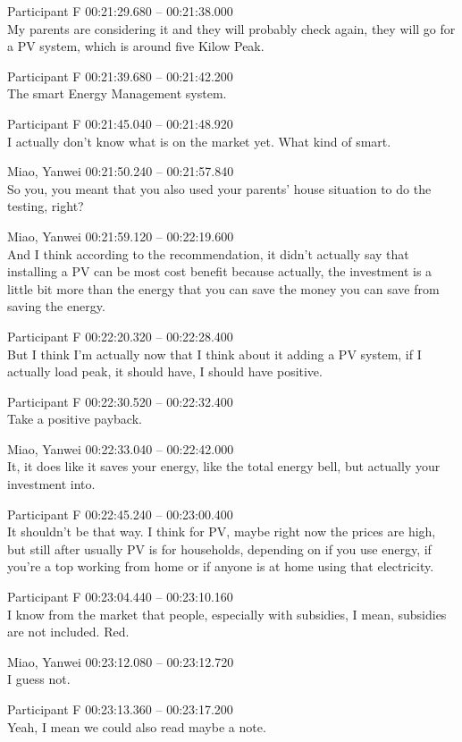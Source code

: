 {Participant F 00:21:29.680 -- 00:21:38.000 \\
My parents are considering it and they will probably check again, they will go for a PV system, which is around five Kilow Peak.

Participant F 00:21:39.680 -- 00:21:42.200 \\
The smart Energy Management system.

Participant F 00:21:45.040 -- 00:21:48.920 \\
I actually don't know what is on the market yet. What kind of smart.

Miao, Yanwei 00:21:50.240 -- 00:21:57.840 \\
So you, you meant that you also used your parents' house situation to do the testing, right?

Miao, Yanwei 00:21:59.120 -- 00:22:19.600 \\
And I think according to the recommendation, it didn't actually say that installing a PV can be most cost benefit because actually, the investment is a little bit more than the energy that you can save the money you can save from saving the energy.

Participant F 00:22:20.320 -- 00:22:28.400 \\
But I think I'm actually now that I think about it adding a PV system, if I actually load peak, it should have, I should have positive.

Participant F 00:22:30.520 -- 00:22:32.400 \\
Take a positive payback.

Miao, Yanwei 00:22:33.040 -- 00:22:42.000 \\
It, it does like it saves your energy, like the total energy bell, but actually your investment into.

Participant F 00:22:45.240 -- 00:23:00.400 \\
It shouldn't be that way. I think for PV, maybe right now the prices are high, but still after usually PV is for households, depending on if you use energy, if you're a top working from home or if anyone is at home using that electricity.

Participant F 00:23:04.440 -- 00:23:10.160 \\
I know from the market that people, especially with subsidies, I mean, subsidies are not included. Red.

Miao, Yanwei 00:23:12.080 -- 00:23:12.720 \\
I guess not.

Participant F 00:23:13.360 -- 00:23:17.200 \\
Yeah, I mean we could also read maybe a note.

}
